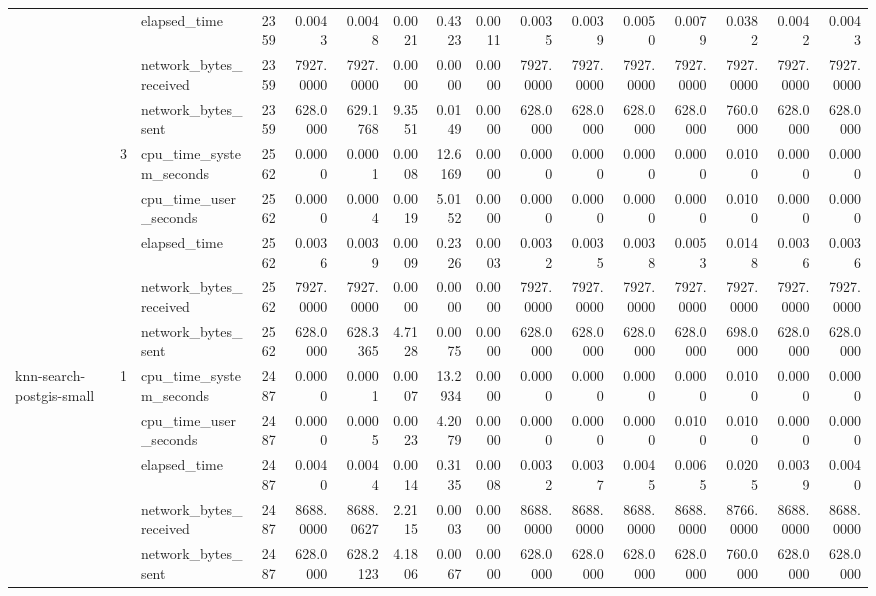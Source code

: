 \begin{tabular}{lllrrrrrrrrrrrrr}
 &  & elapsed\_time & 2359 & 0.0043 & 0.0048 & 0.0021 & 0.4323 & 0.0011 & 0.0035 & 0.0039 & 0.0050 & 0.0079 & 0.0382 & 0.0042 & 0.0043 \\
 &  & network\_bytes\_received & 2359 & 7927.0000 & 7927.0000 & 0.0000 & 0.0000 & 0.0000 & 7927.0000 & 7927.0000 & 7927.0000 & 7927.0000 & 7927.0000 & 7927.0000 & 7927.0000 \\
 &  & network\_bytes\_sent & 2359 & 628.0000 & 629.1768 & 9.3551 & 0.0149 & 0.0000 & 628.0000 & 628.0000 & 628.0000 & 628.0000 & 760.0000 & 628.0000 & 628.0000 \\
\cline{2-16}
 & \multirow[t]{5}{*}{3} & cpu\_time\_system\_seconds & 2562 & 0.0000 & 0.0001 & 0.0008 & 12.6169 & 0.0000 & 0.0000 & 0.0000 & 0.0000 & 0.0000 & 0.0100 & 0.0000 & 0.0000 \\
 &  & cpu\_time\_user\_seconds & 2562 & 0.0000 & 0.0004 & 0.0019 & 5.0152 & 0.0000 & 0.0000 & 0.0000 & 0.0000 & 0.0000 & 0.0100 & 0.0000 & 0.0000 \\
 &  & elapsed\_time & 2562 & 0.0036 & 0.0039 & 0.0009 & 0.2326 & 0.0003 & 0.0032 & 0.0035 & 0.0038 & 0.0053 & 0.0148 & 0.0036 & 0.0036 \\
 &  & network\_bytes\_received & 2562 & 7927.0000 & 7927.0000 & 0.0000 & 0.0000 & 0.0000 & 7927.0000 & 7927.0000 & 7927.0000 & 7927.0000 & 7927.0000 & 7927.0000 & 7927.0000 \\
 &  & network\_bytes\_sent & 2562 & 628.0000 & 628.3365 & 4.7128 & 0.0075 & 0.0000 & 628.0000 & 628.0000 & 628.0000 & 628.0000 & 698.0000 & 628.0000 & 628.0000 \\
\cline{1-16} \cline{2-16}
\multirow[t]{15}{*}{knn-search-postgis-small} & \multirow[t]{5}{*}{1} & cpu\_time\_system\_seconds & 2487 & 0.0000 & 0.0001 & 0.0007 & 13.2934 & 0.0000 & 0.0000 & 0.0000 & 0.0000 & 0.0000 & 0.0100 & 0.0000 & 0.0000 \\
 &  & cpu\_time\_user\_seconds & 2487 & 0.0000 & 0.0005 & 0.0023 & 4.2079 & 0.0000 & 0.0000 & 0.0000 & 0.0000 & 0.0100 & 0.0100 & 0.0000 & 0.0000 \\
 &  & elapsed\_time & 2487 & 0.0040 & 0.0044 & 0.0014 & 0.3135 & 0.0008 & 0.0032 & 0.0037 & 0.0045 & 0.0065 & 0.0205 & 0.0039 & 0.0040 \\
 &  & network\_bytes\_received & 2487 & 8688.0000 & 8688.0627 & 2.2115 & 0.0003 & 0.0000 & 8688.0000 & 8688.0000 & 8688.0000 & 8688.0000 & 8766.0000 & 8688.0000 & 8688.0000 \\
 &  & network\_bytes\_sent & 2487 & 628.0000 & 628.2123 & 4.1806 & 0.0067 & 0.0000 & 628.0000 & 628.0000 & 628.0000 & 628.0000 & 760.0000 & 628.0000 & 628.0000 \\

\end{tabular}
